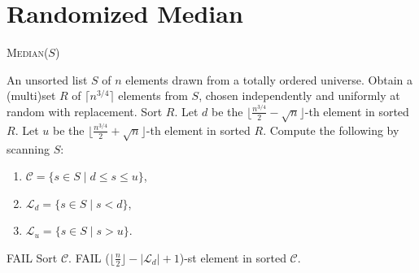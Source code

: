 \documentclass[12pt,a4paper]{article}
\begin{document}
	\section{Randomized Median}
	\begin{algorithm}[H]
		\caption{\textsc{Randomized Median}}
		\label{alg:randmedian}
		\textsc{Median}(\(S\))
		\begin{algorithmic}[1]
			\REQUIRE An unsorted list \(S\) of \(n\) elements drawn from a totally ordered universe.
			\STATE Obtain a (multi)set \(R\) of \(\lceil n^{3/4} \rceil\) elements from \(S\), chosen independently and uniformly at random with replacement.
			\STATE Sort \(R\).
			\STATE Let \(d\) be the \(\bigl\lfloor \frac{n^{3/4}}{2} - \sqrt{n}\bigr\rfloor\)-th element in sorted \(R\).
			\STATE Let \(u\) be the \(\bigl\lfloor \frac{n^{3/4}}{2} + \sqrt{n}\bigr\rfloor\)-th element in sorted \(R\).
			\STATE Compute the following by scanning \(S\):
			\begin{enumerate}[label=(\alph*),nosep]
				\item \(\mathcal{C} = \{s \in S \mid d \le s \le u\}\),
				\item \(\mathcal{L}_d = \{s \in S \mid s < d\}\),
				\item \(\mathcal{L}_u = \{s \in S \mid s > u\}\).
			\end{enumerate}
			\RETURN \textsc{FAIL}
			\ENDIF
			\STATE Sort \(\mathcal{C}\).
			\ELSE
			\RETURN \textsc{FAIL}
			\ENDIF
			\RETURN (\(\lfloor \tfrac{n}{2}\rfloor - |\mathcal{L}_d| + 1\))-st element in sorted \(\mathcal{C}\).
		\end{algorithmic}
	\end{algorithm}
\end{document}
